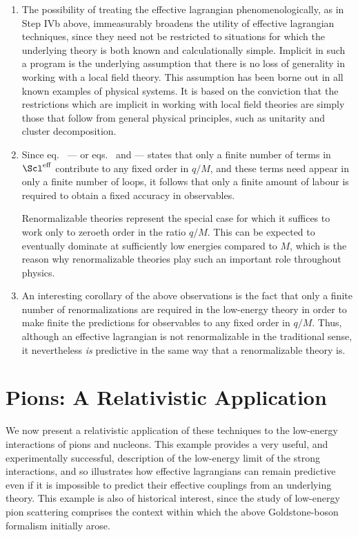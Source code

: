 \begin{enumerate}

\item
The possibility of treating the effective lagrangian
phenomenologically, as in Step IVb above, immeasurably
broadens the utility of effective lagrangian techniques,
since they need not be restricted to situations for which
the underlying theory is both known and calculationally
simple. Implicit in such a program is the underlying
assumption that there is no loss of generality in working
with a local field theory. This assumption has been borne
out in all known examples of physical systems. It is based
on the conviction that the restrictions which are implicit
in working with local field theories are simply those that
follow from general physical principles, such as unitarity
and cluster decomposition.

\item
Since eq.~ --- or 
eqs.~ and 
 --- states that only a finite
number of terms in $\leff$ contribute to any fixed order in
$q/M$, and these terms need appear in only a finite number
of loops, it follows that only a finite amount of labour is
required to obtain a fixed accuracy in observables.

Renormalizable theories represent the special case for
which it suffices to work only to zeroeth order in the
ratio $q/M$. This can be expected to eventually
dominate at sufficiently low energies compared to
$M$, which is the reason why renormalizable 
theories play such an important role throughout 
physics.

\item
An interesting corollary of the above observations is the
fact that only a finite number of renormalizations are
required in the low-energy theory in order to make finite
the predictions for observables to any fixed order in
$q/M$. Thus, although an effective lagrangian is not
renormalizable in the traditional sense, it nevertheless
{\em is} predictive in the same way that a renormalizable
theory is.

\end{enumerate}


\chapter{Pions: A Relativistic Application}

We now present a relativistic application of these
techniques to the low-energy interactions of pions and
nucleons. This example provides a very useful, and
experimentally successful, description of the low-energy
limit of the strong interactions, and so illustrates how
effective lagrangians can remain predictive even if it is
impossible to predict their effective couplings from an
underlying theory. This example is also of historical
interest, since the study of low-energy pion scattering
comprises the context within which the above
Goldstone-boson formalism initially arose.

